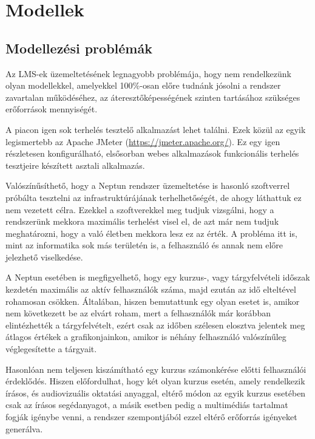 \section{Modellek}\label{sec:modellek}

\subsection{Modellezési problémák}

Az LMS-ek üzemeltetésének legnagyobb problémája, hogy nem rendelkezünk olyan modellekkel, amelyekkel 100\%-osan előre tudnánk jósolni a rendszer zavartalan működéséhez, az áteresztőképességének szinten tartásához szükséges erőforrások mennyiségét.

A piacon igen sok terhelés tesztelő alkalmazást lehet találni. Ezek közül az egyik legismertebb az Apache JMeter (\href{https://jmeter.apache.org/}{https://jmeter.apache.org/}). Ez egy igen részletesen konfigurálható, elsősorban webes alkalmazások funkcionális terhelés tesztjeire készített asztali alkalmazás.

Valószínűsíthető, hogy a Neptun rendszer üzemeltetése is hasonló szoftverrel próbálta tesztelni az infrastruktúrájának terhelhetőségét, de ahogy láthattuk ez nem vezetett célra. Ezekkel a szoftverekkel meg tudjuk vizsgálni, hogy a rendszerünk mekkora maximális terhelést visel el, de azt már nem tudjuk meghatározni, hogy a való életben mekkora lesz ez az érték. A probléma itt is, mint az informatika sok más területén is, a felhasználó és annak nem előre jelezhető viselkedése.

A Neptun esetében is megfigyelhető, hogy egy kurzus-, vagy tárgyfelvételi időszak kezdetén maximális az aktív felhasználók száma, majd ezután az idő elteltével rohamosan csökken. Általában, hiszen bemutattunk egy olyan esetet is, amikor nem következett be az elvárt roham, mert a felhasználók már korábban elintézhették a tárgyfelvételt, ezért csak az időben szélesen elosztva jelentek meg átlagos értékek a grafikonjainkon, amikor is néhány felhasználó valószínűleg véglegesítette a tárgyait.

Hasonlóan nem teljesen kiszámítható egy kurzus számonkérése előtti felhasználói érdeklődés. Hiszen előfordulhat, hogy két olyan kurzus esetén, amely rendelkezik írásos, és audiovizuális oktatási anyaggal, eltérő módon az egyik kurzus esetében csak az írásos segédanyagot, a másik esetben pedig a multimédiás tartalmat fogják igénybe venni, a rendszer szempontjából ezzel eltérő erőforrás igényeket generálva.

